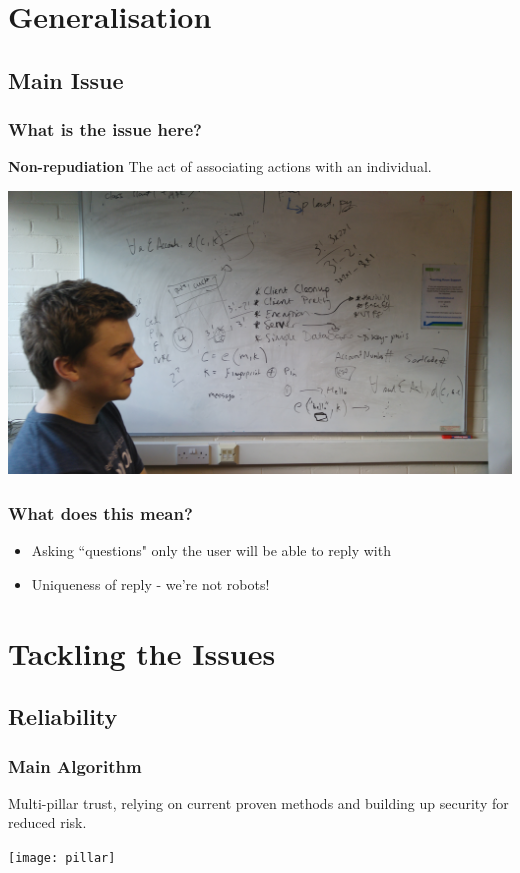 \documentclass{beamer}
\begin{document}
  \section{Generalisation}
    \subsection{Main Issue}
      \begin{frame}
        \frametitle{What is the issue here?}
        \hfill
        \textbf{Non-repudiation}
        \vfill
        The act of associating actions with an individual.
        \begin{center}
          \includegraphics[scale=0.05]{scribbles}
        \end{center}
      \end{frame}
      \begin{frame}
        \frametitle{What does this mean?}
        \begin{itemize}
          \item Asking ``questions" only the user will be able to reply with
          \item Uniqueness of reply - we're not robots!
        \end{itemize}
      \end{frame}
  \section{Tackling the Issues}
    \subsection{Reliability}
      \begin{frame}
        \frametitle{Main Algorithm}
        Multi-pillar trust, relying on current proven methods and building up
        security for reduced risk.
        \vfill
        \begin{center}
          \texttt{[image: pillar]}
        \end{center}
      \end{frame}
\end{document}
